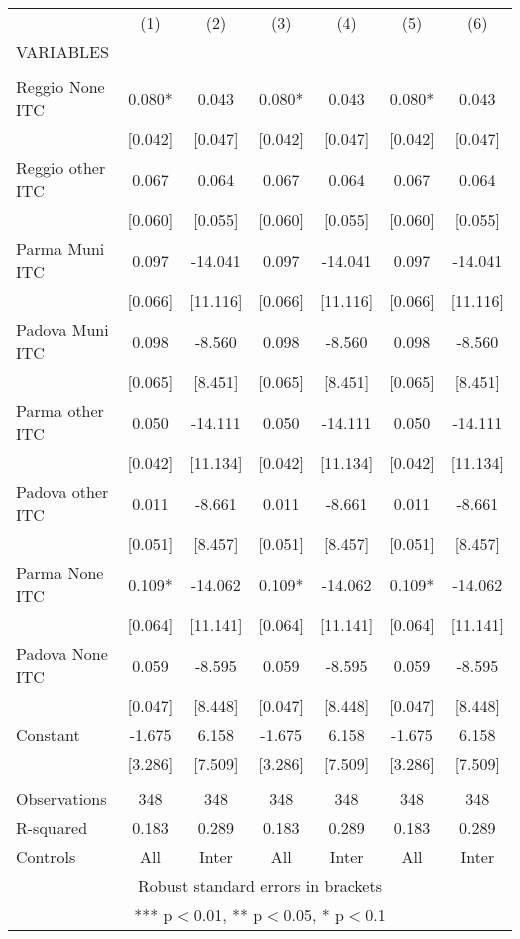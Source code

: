 \begin{tabular}{lcccccc} \hline
 & (1) & (2) & (3) & (4) & (5) & (6) \\
VARIABLES &  &  &  &  &  &  \\ \hline
 &  &  &  &  &  &  \\
Reggio None ITC & 0.080* & 0.043 & 0.080* & 0.043 & 0.080* & 0.043 \\
 & [0.042] & [0.047] & [0.042] & [0.047] & [0.042] & [0.047] \\
Reggio other ITC & 0.067 & 0.064 & 0.067 & 0.064 & 0.067 & 0.064 \\
 & [0.060] & [0.055] & [0.060] & [0.055] & [0.060] & [0.055] \\
Parma Muni ITC & 0.097 & -14.041 & 0.097 & -14.041 & 0.097 & -14.041 \\
 & [0.066] & [11.116] & [0.066] & [11.116] & [0.066] & [11.116] \\
Padova Muni ITC & 0.098 & -8.560 & 0.098 & -8.560 & 0.098 & -8.560 \\
 & [0.065] & [8.451] & [0.065] & [8.451] & [0.065] & [8.451] \\
Parma other ITC & 0.050 & -14.111 & 0.050 & -14.111 & 0.050 & -14.111 \\
 & [0.042] & [11.134] & [0.042] & [11.134] & [0.042] & [11.134] \\
Padova other ITC & 0.011 & -8.661 & 0.011 & -8.661 & 0.011 & -8.661 \\
 & [0.051] & [8.457] & [0.051] & [8.457] & [0.051] & [8.457] \\
Parma None ITC & 0.109* & -14.062 & 0.109* & -14.062 & 0.109* & -14.062 \\
 & [0.064] & [11.141] & [0.064] & [11.141] & [0.064] & [11.141] \\
Padova None ITC & 0.059 & -8.595 & 0.059 & -8.595 & 0.059 & -8.595 \\
 & [0.047] & [8.448] & [0.047] & [8.448] & [0.047] & [8.448] \\
Constant & -1.675 & 6.158 & -1.675 & 6.158 & -1.675 & 6.158 \\
 & [3.286] & [7.509] & [3.286] & [7.509] & [3.286] & [7.509] \\
 &  &  &  &  &  &  \\
Observations & 348 & 348 & 348 & 348 & 348 & 348 \\
R-squared & 0.183 & 0.289 & 0.183 & 0.289 & 0.183 & 0.289 \\
 Controls & All & Inter & All & Inter & All & Inter \\ \hline
\multicolumn{7}{c}{ Robust standard errors in brackets} \\
\multicolumn{7}{c}{ *** p$<$0.01, ** p$<$0.05, * p$<$0.1} \\
\end{tabular}
